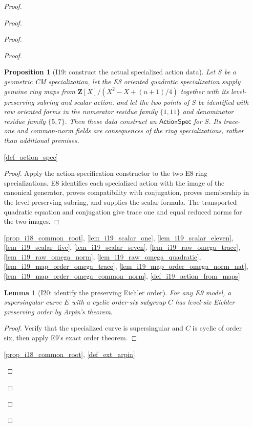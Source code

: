 \documentclass[11pt,a4paper]{article}
\numberwithin{equation}{section}
\theoremstyle{plain}\newtheorem{theorem}{Theorem}[section]\newaliascnt{proposition}{theorem}\newtheorem{proposition}[proposition]{Proposition}\aliascntresetthe{proposition}\newaliascnt{lemma}{theorem}\newtheorem{lemma}[lemma]{Lemma}\aliascntresetthe{lemma}
\theoremstyle{definition}\newaliascnt{definition}{theorem}\newtheorem{definition}[definition]{Definition}\aliascntresetthe{definition}\newaliascnt{notation}{theorem}\newtheorem{notation}[notation]{Notation}\aliascntresetthe{notation}
\providecommand{\lean}[1]{}\providecommand{\leanok}{}
\begin{document}
\begin{proof}
\begin{proof}
\begin{proof}
\begin{proof}
\begin{proposition}[I19: construct the actual specialized action data]\label{prop_i19_actual_action_spec}\lean{SptCM.Repair.actualOrientedSpecializedActions_of_E8}\leanok
Let $S$ be a geometric CM specialization, let the E8 oriented quadratic
specialization supply genuine ring maps from
$\mathbf Z[X]/(X^2-X+(n+1)/4)$ together with its level-preserving subring
and scalar action, and let the two points of $S$ be identified with raw
oriented forms in the numerator residue family $\{1,11\}$ and denominator
residue family $\{5,7\}$.  Then these data construct an
$\mathsf{ActionSpec}$ for $S$.  Its trace-one and common-norm fields are
consequences of the ring specializations, rather than additional premises.
\end{proposition}
\begin{uses-statement}\ref{def_action_spec}\end{uses-statement}
\begin{proof}
Apply the action-specification constructor to the two E8 ring
specializations.  E8 identifies each specialized action with the image of
the canonical generator, proves compatibility with conjugation, proves
membership in the level-preserving subring, and supplies the scalar formula.
The transported quadratic equation and conjugation give trace one and equal
reduced norms for the two images.
\end{proof}
\begin{uses-proof}\ref{prop_i18_common_root}, \ref{lem_i19_scalar_one},
\ref{lem_i19_scalar_eleven}, \ref{lem_i19_scalar_five},
\ref{lem_i19_scalar_seven}, \ref{lem_i19_raw_omega_trace},
\ref{lem_i19_raw_omega_norm}, \ref{lem_i19_raw_omega_quadratic},
\ref{lem_i19_map_order_omega_trace},
\ref{lem_i19_map_order_omega_norm_nat},
\ref{lem_i19_map_order_omega_common_norm},
\ref{def_i19_action_from_maps}\end{uses-proof}

\begin{lemma}[I20: identify the preserving Eichler order]\label{lem_i20_eichler_order}\lean{SptCM.Repair.preservingOrder_isEichlerOfLevelSix}\leanok
For any E9 model, a supersingular curve $E$ with a cyclic order-six subgroup $C$ has level-six Eichler preserving order by Arpin's theorem.
\end{lemma}
\begin{proof}Verify that the specialized curve is supersingular and $C$ is cyclic of order six, then apply E9's exact order theorem.\end{proof}
\begin{uses-proof}\ref{prop_i18_common_root}, \ref{def_ext_arpin}\end{uses-proof}


\end{proof}
\end{proof}
\end{proof}
\end{proof}
\end{document}
